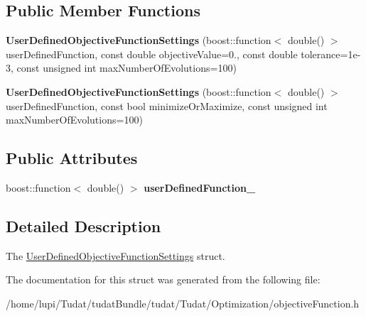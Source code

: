 \subsection*{Public Member Functions}
\begin{DoxyCompactItemize}
\item 
{\bfseries User\+Defined\+Objective\+Function\+Settings} (boost\+::function$<$ double() $>$ user\+Defined\+Function, const double objective\+Value=0., const double tolerance=1e-\/3, const unsigned int max\+Number\+Of\+Evolutions=100)\hypertarget{structtudat_1_1optimization_1_1UserDefinedObjectiveFunctionSettings_a6fed679c86d8bf2bb97208d9455c73e2}{}\label{structtudat_1_1optimization_1_1UserDefinedObjectiveFunctionSettings_a6fed679c86d8bf2bb97208d9455c73e2}

\item 
{\bfseries User\+Defined\+Objective\+Function\+Settings} (boost\+::function$<$ double() $>$ user\+Defined\+Function, const bool minimize\+Or\+Maximize, const unsigned int max\+Number\+Of\+Evolutions=100)\hypertarget{structtudat_1_1optimization_1_1UserDefinedObjectiveFunctionSettings_abb9da146014da0d4f122f7a1b1908543}{}\label{structtudat_1_1optimization_1_1UserDefinedObjectiveFunctionSettings_abb9da146014da0d4f122f7a1b1908543}

\end{DoxyCompactItemize}
\subsection*{Public Attributes}
\begin{DoxyCompactItemize}
\item 
boost\+::function$<$ double() $>$ {\bfseries user\+Defined\+Function\+\_\+}\hypertarget{structtudat_1_1optimization_1_1UserDefinedObjectiveFunctionSettings_a256870e4262628320f7454bede0695ec}{}\label{structtudat_1_1optimization_1_1UserDefinedObjectiveFunctionSettings_a256870e4262628320f7454bede0695ec}

\end{DoxyCompactItemize}


\subsection{Detailed Description}
The \hyperlink{structtudat_1_1optimization_1_1UserDefinedObjectiveFunctionSettings}{User\+Defined\+Objective\+Function\+Settings} struct. 

The documentation for this struct was generated from the following file\+:\begin{DoxyCompactItemize}
\item 
/home/lupi/\+Tudat/tudat\+Bundle/tudat/\+Tudat/\+Optimization/objective\+Function.\+h\end{DoxyCompactItemize}
